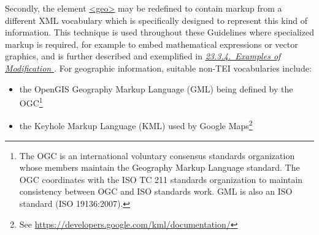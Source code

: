 Secondly, the element \hyperref[TEI.geo]{<geo>} may be redefined to contain markup from a different XML vocabulary which is specifically designed to represent this kind of information. This technique is used throughout these Guidelines where specialized markup is required, for example to embed mathematical expressions or vector graphics, and is further described and exemplified in \textit{\hyperref[MDlite]{23.3.4.\ Examples of Modification }}. For geographic information, suitable non-TEI vocabularies include: \begin{itemize}
\item the OpenGIS Geography Markup Language (GML) being defined by the OGC\footnote{The OGC is an international voluntary consensus standards organization whose members maintain the Geography Markup Language standard. The OGC coordinates with the ISO TC 211 standards organization to maintain consistency between OGC and ISO standards work. GML is also an ISO standard (ISO 19136:2007).}
\item the Keyhole Markup Language (KML) used by Google Maps\footnote{See \url{https://developers.google.com/kml/documentation/}}
\end{itemize} \par
